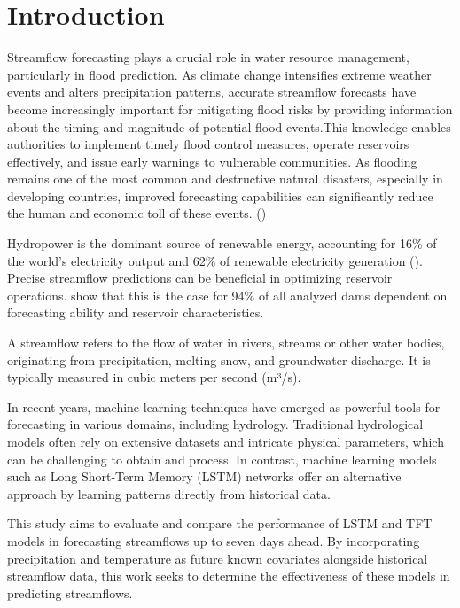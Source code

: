 \documentclass[
]{krantz}
\begin{document}
\section{Introduction}\label{introduction-5}

Streamflow forecasting plays a crucial role in water resource management, particularly in flood prediction. As climate change intensifies extreme weather events and alters precipitation patterns, accurate streamflow forecasts have become increasingly important for mitigating flood risks by providing information about the timing and magnitude of potential flood events.This knowledge enables authorities to implement timely flood control measures, operate reservoirs effectively, and issue early warnings to vulnerable communities. As flooding remains one of the most common and destructive natural disasters, especially in developing countries, improved forecasting capabilities can significantly reduce the human and economic toll of these events. (\citet{nearing2024})

Hydropower is the dominant source of renewable energy, accounting for 16\% of the world's electricity output and 62\% of renewable electricity generation (\citet{lee2022}). Precise streamflow predictions can be beneficial in optimizing reservoir operations. \citet{lee2022} show that this is the case for 94\% of all analyzed dams dependent on forecasting ability and reservoir characteristics.

A streamflow refers to the flow of water in rivers, streams or other water bodies, originating from precipitation, melting snow, and groundwater discharge. It is typically measured in cubic meters per second (m³/s).

In recent years, machine learning techniques have emerged as powerful tools for forecasting in various domains, including hydrology. Traditional hydrological models often rely on extensive datasets and intricate physical parameters, which can be challenging to obtain and process. In contrast, machine learning models such as Long Short-Term Memory (LSTM) networks offer an alternative approach by learning patterns directly from historical data.

This study aims to evaluate and compare the performance of LSTM and TFT models in forecasting streamflows up to seven days ahead. By incorporating precipitation and temperature as future known covariates alongside historical streamflow data, this work seeks to determine the effectiveness of these models in predicting streamflows.
\end{document}

